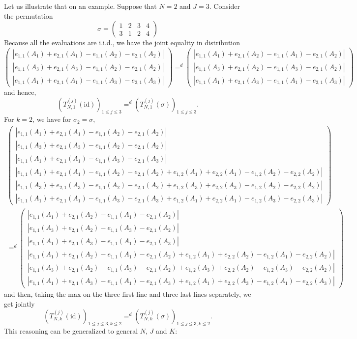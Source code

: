 \documentclass{article}
\theoremstyle{plain}
\theoremstyle{remark}
\newcommand{\1}{\mathbbm{1}}
\newcommand{\id}{\mathrm{id}}
\numberwithin{equation}{section}
\begin{document}
Let us illustrate that on an example. Suppose that $N=2$ and $J=3$.  Consider the permutation 
\[
  \sigma = 
  \begin{pmatrix}
    1 & 2 & 3 & 4\\
    3 & 1 & 2 & 4 
  \end{pmatrix}
\]
Because all the evaluations are i.i.d., we have the joint equality in distribution
$$
\begin{pmatrix}
|e_{1,1}(A_1)+e_{2,1}(A_1)-e_{1,1}(A_2)-e_{2,1}(A_2)| \\
|e_{1,1}(A_3)+e_{2,1}(A_3)-e_{1,1}(A_2)-e_{2,1}(A_2)| \\
|e_{1,1}(A_1)+e_{2,1}(A_1)-e_{1,1}(A_3)-e_{2,1}(A_3)|
 \end{pmatrix} 
=^d
\begin{pmatrix}
|e_{1,1}(A_1)+e_{2,1}(A_2)-e_{1,1}(A_1)-e_{2,1}(A_2)| \\
|e_{1,1}(A_3)+e_{2,1}(A_2)-e_{1,1}(A_3)-e_{2,1}(A_2)| \\
|e_{1,1}(A_1)+e_{2,1}(A_3)-e_{1,1}(A_1)-e_{2,1}(A_3)|
 \end{pmatrix} 
$$
and hence, 
$$(T_{N,1}^{(j)}(\id))_{1\le j\le 3}=^d(T_{N,1}^{(j)}(\sigma))_{1\le j\le 3}.$$
For $k=2$, we have for $\sigma_2 = \sigma$,
\begin{multline*}
\begin{pmatrix}
|e_{1,1}(A_1)+e_{2,1}(A_1)-e_{1,1}(A_2)-e_{2,1}(A_2)| \\
|e_{1,1}(A_3)+e_{2,1}(A_3)-e_{1,1}(A_2)-e_{2,1}(A_2)| \\
|e_{1,1}(A_1)+e_{2,1}(A_1)-e_{1,1}(A_3)-e_{2,1}(A_3)| \\
|e_{1,1}(A_1)+e_{2,1}(A_1)-e_{1,1}(A_2)-e_{2,1}(A_2)+e_{1,2}(A_1)+e_{2,2}(A_1)-e_{1,2}(A_2)-e_{2,2}(A_2)| \\
|e_{1,1}(A_3)+e_{2,1}(A_3)-e_{1,1}(A_2)-e_{2,1}(A_2)+e_{1,2}(A_3)+e_{2,2}(A_3)-e_{1,2}(A_2)-e_{2,2}(A_2)| \\
|e_{1,1}(A_1)+e_{2,1}(A_1)-e_{1,1}(A_3)-e_{2,1}(A_3)+e_{1,2}(A_1)+e_{2,2}(A_1)-e_{1,2}(A_3)-e_{2,2}(A_3)|
 \end{pmatrix} \\
=^d
\begin{pmatrix}
|e_{1,1}(A_1)+e_{2,1}(A_2)-e_{1,1}(A_1)-e_{2,1}(A_2)| \\
|e_{1,1}(A_3)+e_{2,1}(A_2)-e_{1,1}(A_3)-e_{2,1}(A_2)| \\
|e_{1,1}(A_1)+e_{2,1}(A_3)-e_{1,1}(A_1)-e_{2,1}(A_3)|\\
|e_{1,1}(A_1)+e_{2,1}(A_2)-e_{1,1}(A_1)-e_{2,1}(A_2)+e_{1,2}(A_1)+e_{2,2}(A_2)-e_{1,2}(A_1)-e_{2,2}(A_2)| \\
|e_{1,1}(A_3)+e_{2,1}(A_2)-e_{1,1}(A_3)-e_{2,1}(A_2)+e_{1,2}(A_3)+e_{2,2}(A_2)-e_{1,2}(A_3)-e_{2,2}(A_2)| \\
|e_{1,1}(A_1)+e_{2,1}(A_3)-e_{1,1}(A_1)-e_{2,1}(A_3)+e_{1,2}(A_1)+e_{2,2}(A_3)-e_{1,2}(A_1)-e_{2,2}(A_3)|
 \end{pmatrix} 
\end{multline*}
and then, taking the max on the three first line and three last lines separately, we get jointly
$$(T_{N,k}^{(j)}(\id))_{1\le j\le 3, k\le 2}=^d(T_{N,k}^{(j)}(\sigma))_{1\le j\le 3, k\le 2}.$$
This reasoning can be generalized to general $N$, $J$ and $K$:
\end{document}
